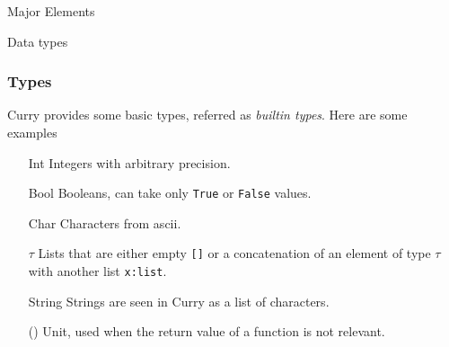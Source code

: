 \documentclass{beamer}
\newcommand{\q}[1]{\texttt{#1}}
\begin{document}
\begin{section}{Major Elements}
\begin{subsection}{Data types}
    \begin{frame}
      \frametitle{Types}
      Curry provides some basic types, referred as \textit{builtin types}.
      Here
      are some examples
      \begin{itemize}
      \item[Int] Integers with arbitrary precision.
      \item[Bool] Booleans, can take only \q{True} or \q{False} values.
      \item[Char] Characters from ascii.
      \item[\lbrack$\tau$\rbrack ] Lists that are either empty \q{[]} or a
        concatenation of an element of type $\tau$ with another list
        \q{x:list}.
      \item[String] Strings are seen in Curry as a list of characters.
      \item[()] Unit, used when the return value of a function is not
        relevant.
      \end{itemize}

    \end{frame}
  \end{subsection}  
\end{section}
\end{document}
